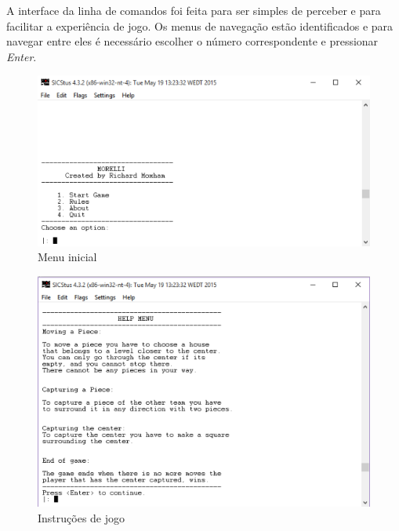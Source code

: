 \documentclass[a4paper]{article}
\begin{document}
A interface da linha de comandos foi feita para ser simples de perceber e para facilitar a experiência de jogo. Os menus de navegação estão identificados e para navegar entre eles é necessário escolher o número correspondente e pressionar \textit{Enter}. 

\begin{figure}[h!]
\begin{center}
\hspace*{-0.5cm}\includegraphics[scale=1]{menu1.png}
\caption{Menu inicial}
\end{center}
\end{figure}

\begin{figure}[h!]
\begin{center}
\hspace*{-0.5cm}\includegraphics[scale=0.83]{helpmenu.png}
\caption{Instruções de jogo}
\end{center}
\end{figure}
\end{document}
